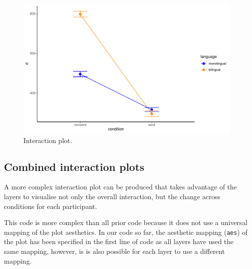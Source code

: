 \documentclass[
  english,
  doc,floatsintext]{apa6}
\begin{document}
\begin{figure}

{\centering \includegraphics[width=1\linewidth]{images/ixn-1} 

}

\caption{Interaction plot.}\label{fig:ixn}
\end{figure}

\hypertarget{combined-interaction-plots}{%
\subsection{Combined interaction plots}\label{combined-interaction-plots}}

A more complex interaction plot can be produced that takes advantage of the layers to visualise not only the overall interaction, but the change across conditions for each participant.

This code is more complex than all prior code because it does not use a universal mapping of the plot aesthetics. In our code so far, the aesthetic mapping (\texttt{aes}) of the plot has been specified in the first line of code as all layers have used the same mapping, however, is is also possible for each layer to use a different mapping.
\end{document}
